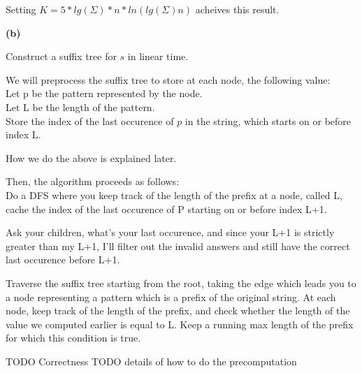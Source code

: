 \documentclass[11pt]{article}
\renewcommand{\part}[1] {\vspace{.10in} {\bf (#1)}}
\begin{document}
Setting $K = 5*lg(\Sigma)*n*ln(lg(\Sigma)n)$ acheives this result.


\part{b}

Construct a suffix tree for $s$ in linear time.

We will preprocess the suffix tree to store at each node, the following value:\\
Let p be the pattern represented by the node.\\
Let L be the length of the pattern.\\
Store the index of the last occurence of $p$ in the string, which starts on or before index L.

How we do the above is explained later.

Then, the algorithm proceeds as follows:\\



Do a DFS where you keep track of the length of the prefix at a node, called L,
cache the index of the last occurence of P starting on or before index L+1.

Ask your children, what's your last occurence, and since your L+1 is strictly greater than my L+1, I'll filter out the invalid answers and still have the correct last occurence before L+1.

Traverse the suffix tree starting from the root, taking the edge which leads you to a node representing a pattern which is a prefix of the original string.
At each node, keep track of the length of the prefix, and check whether the length of the value we computed earlier is equal to L.
Keep a running max length of the prefix for which this condition is true.


TODO Correctness
TODO details of how to do the precomputation
\end{document}
